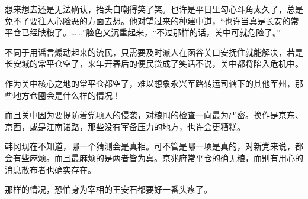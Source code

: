 想来想去还是无法确认，抬头自嘲得笑了笑。也许是平日里勾心斗角太久了，总是免不了要往人心险恶的方面去想。他对望过来的种建中道，“也许当真是长安的常平仓已经缺粮了。……”脸色又沉重起来，“不过那样的话，关中可就危险了。”

不同于用谣言煽动起来的流民，只需要及时派人在函谷关口安抚住就能解决，若是长安城的常平仓空了，来年开春后的便民贷成了笑话不说，关中都将陷入危机中。

作为关中核心之地的常平仓都空了，难以想象永兴军路转运司辖下的其他军州，那些地方仓囤会是什么样的情况！

而且关中因为要提防着党项人的侵袭，对粮囤的检查一向最为严密。换作是京东、京西，或是江南诸路，那些没有军备压力的地方，也许会更糟糕。

韩冈现在不知道，哪一个猜测会是真相。可不管是哪一项是真的，对新党来说，都会有些麻烦。而且最麻烦的是两者皆为真。京兆府常平仓的确无粮，而别有用心的消息散布者也确实存在。

那样的情况，恐怕身为宰相的王安石都要好一番头疼了。

